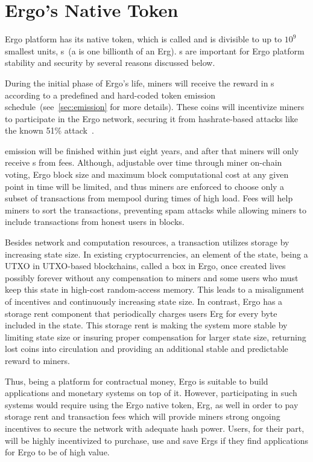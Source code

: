 \section{Ergo's Native Token}
\label{sec:currency}

Ergo platform has its native token, which is
called \Erg{} and is divisible to up to $10^9$ smallest units, \nanoErg{}s~(a \nanoErg{} is one billionth of an Erg).
\Erg{}s are important for Ergo platform stability and security by several reasons discussed below.

During the initial phase of Ergo's life, miners will receive the reward in \Erg{}s
according to a predefined and hard-coded token emission schedule~(see~\ref{sec:emission} for more details).
These coins will incentivize miners to participate in the Ergo network, securing it from hashrate-based attacks
like the known 51\% attack~\cite{reorgAttack}.

\Erg{} emission will be finished within just eight years, and after that miners will only receive \Erg{}s from
fees.
Although, adjustable over time through miner on-chain voting, Ergo block size and maximum block computational
cost at any given point in time will be limited,
and thus miners are enforced to
choose only a subset of transactions from mempool during times of high load.
Fees will help miners to sort the transactions, preventing spam attacks while allowing miners
to include transactions from honest users in blocks.

Besides network and computation resources, a transaction utilizes storage by increasing state size.
In existing cryptocurrencies, an element of the state, being  a UTXO  in  UTXO-based  blockchains,  called  a box
in  Ergo, once created lives possibly forever without any compensation to miners and some users who must keep this state
in high-cost random-access memory. This leads to a misalignment of incentives and continuously increasing state size.
In contrast, Ergo has a storage rent component that periodically charges users Erg for every byte
included in the state.
This storage rent is making the system more stable by limiting state size or insuring proper compensation for larger
state size, returning lost coins into
circulation and providing an additional stable and predictable reward to miners.

Thus, being a platform for contractual money, Ergo is suitable to build applications and monetary systems
on top of it.
However, participating in such systems would require using the Ergo native token, Erg, as well in order to pay
storage rent and transaction fees which will provide miners strong ongoing incentives to secure the network with
adequate hash power. Users, for their part, will be highly incentivized to purchase, use and save Ergs if they
find applications for Ergo to be of high value.

